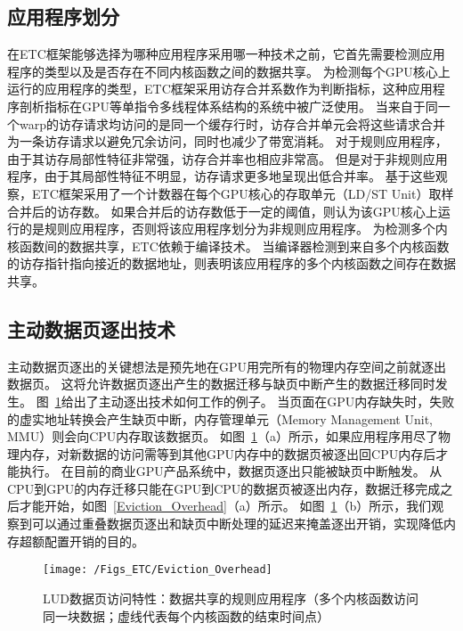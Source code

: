 \subsection{应用程序划分}
\label{AC}

在ETC框架能够选择为哪种应用程序采用哪一种技术之前，它首先需要检测应用程序的类型以及是否存在不同内核函数之间的数据共享。
为检测每个GPU核心上运行的应用程序的类型，ETC框架采用访存合并系数作为判断指标，这种应用程序剖析指标在GPU等单指令多线程体系结构的系统中被广泛使用。
当来自于同一个warp的访存请求均访问的是同一个缓存行时，访存合并单元会将这些请求合并为一条访存请求以避免冗余访问，同时也减少了带宽消耗。
对于规则应用程序，由于其访存局部性特征非常强，访存合并率也相应非常高。
但是对于非规则应用程序，由于其局部性特征不明显，访存请求更多地呈现出低合并率。
基于这些观察，ETC框架采用了一个计数器在每个GPU核心的存取单元（LD/ST Unit）取样合并后的访存数。
如果合并后的访存数低于一定的阈值，则认为该GPU核心上运行的是规则应用程序，否则将该应用程序划分为非规则应用程序。
为检测多个内核函数间的数据共享，ETC依赖于编译技术。
当编译器检测到来自多个内核函数的访存指针指向接近的数据地址，则表明该应用程序的多个内核函数之间存在数据共享。


\subsection{主动数据页逐出技术}

主动数据页逐出的关键想法是预先地在GPU用完所有的物理内存空间之前就逐出数据页。
这将允许数据页逐出产生的数据迁移与缺页中断产生的数据迁移同时发生。
图~\ref{fig:Eviction_Overhead}给出了主动逐出技术如何工作的例子。
当页面在GPU内存缺失时，失败的虚实地址转换会产生缺页中断，内存管理单元（Memory Management Unit, MMU）则会向CPU内存取该数据页。
如图~\ref{fig:Eviction_Overhead}（a）所示，如果应用程序用尽了物理内存，对新数据的访问需等到其他GPU内存中的数据页被逐出回CPU内存后才能执行。
在目前的商业GPU产品系统中，数据页逐出只能被缺页中断触发。
从CPU到GPU的内存迁移只能在GPU到CPU的数据页被逐出内存，数据迁移完成之后才能开始，如图~\ref{Eviction_Overhead}（a）所示。
如图~\ref{fig:Eviction_Overhead}（b）所示，我们观察到可以通过重叠数据页逐出和缺页中断处理的延迟来掩盖逐出开销，实现降低内存超额配置开销的目的。

\begin{figure}[htbp] %
  \centering
  \texttt{[image: /Figs\_ETC/Eviction\_Overhead]}
  \caption{LUD数据页访问特性：数据共享的规则应用程序（多个内核函数访问同一块数据；虚线代表每个内核函数的结束时间点）}
  \label{fig:Eviction_Overhead}
\end{figure}


